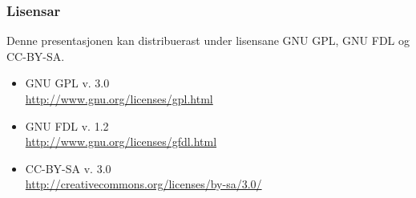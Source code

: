 \documentclass[xcolor=x11names,compress,bigger]{beamer}
\renewcommand{\(}{\begin{columns}}
\renewcommand{\)}{\end{columns}}
\newcommand{\<}[1]{\begin{column}{#1}}
\renewcommand{\>}{\end{column}}
\begin{document}
\begin{frame}\frametitle{Lisensar}
  Denne presentasjonen kan distribuerast under lisensane
  GNU GPL, GNU FDL og CC-BY-SA.
  \begin{itemize}
  \item GNU GPL v. 3.0 \\
    \href{http://www.gnu.org/licenses/gpl.html}{http://www.gnu.org/licenses/gpl.html}
  \item GNU FDL v. 1.2 \\
    \href{http://www.gnu.org/licenses/gfdl.html}{http://www.gnu.org/licenses/gfdl.html}
  \item CC-BY-SA v. 3.0 \\
    \href{http://creativecommons.org/licenses/by-sa/3.0/}{http://creativecommons.org/licenses/by-sa/3.0/}
  \end{itemize}
\end{frame}
\end{document}
